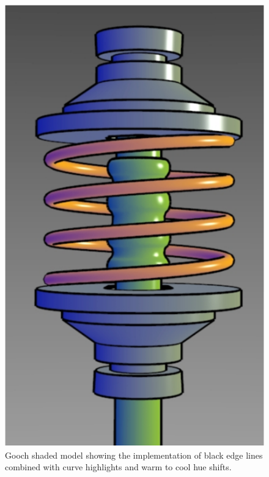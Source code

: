 \begin{figure} [H]
  \includegraphics[scale=0.5]{techreview_v1/one.eps}
  \caption
{ \newline \hspace{\linewidth}
Gooch shaded model showing the implementation of black edge lines combined with curve highlights and warm to cool hue shifts.}
  \label{fig:one}
\end{figure}

